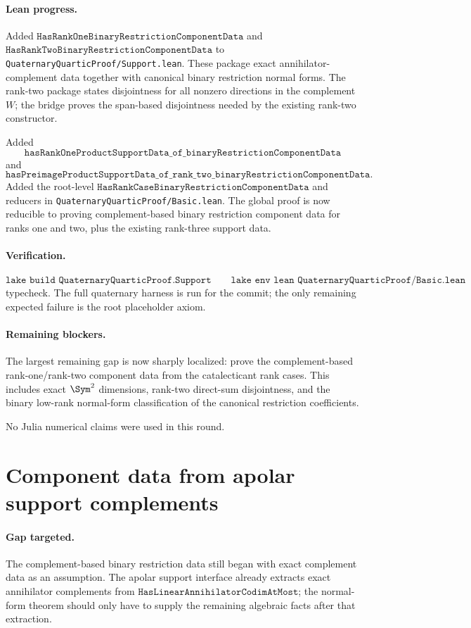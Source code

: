 \documentclass[11pt]{article}
\begin{document}
\paragraph{Lean progress.}
Added \(\texttt{HasRankOneBinaryRestrictionComponentData}\) and
\(\texttt{HasRankTwoBinaryRestrictionComponentData}\) to
\texttt{QuaternaryQuarticProof/Support.lean}.  These package exact
annihilator-complement data together with canonical binary restriction normal
forms.  The rank-two package states disjointness for all nonzero directions in
the complement \(W\); the bridge proves the span-based disjointness needed by
the existing rank-two constructor.

Added
\[
\texttt{hasRankOneProductSupportData\_of\_binaryRestrictionComponentData}
\]
and
\[
\texttt{hasPreimageProductSupportData\_of\_rank\_two\_binaryRestrictionComponentData}.
\]
Added the root-level
\(\texttt{HasRankCaseBinaryRestrictionComponentData}\) and reducers in
\texttt{QuaternaryQuarticProof/Basic.lean}.  The global proof is now reducible
to proving complement-based binary restriction component data for ranks one
and two, plus the existing rank-three support data.

\paragraph{Verification.}
\[
\texttt{lake build QuaternaryQuarticProof.Support}
\qquad
\texttt{lake env lean QuaternaryQuarticProof/Basic.lean}
\]
typecheck.  The full quaternary harness is run for the commit; the only
remaining expected failure is the root placeholder axiom.

\paragraph{Remaining blockers.}
The largest remaining gap is now sharply localized: prove the complement-based
rank-one/rank-two component data from the catalecticant rank cases.  This
includes exact \(\Sym^2\) dimensions, rank-two direct-sum disjointness, and the
binary low-rank normal-form classification of the canonical restriction
coefficients.

No Julia numerical claims were used in this round.

\section*{Component data from apolar support complements}

\paragraph{Gap targeted.}
The complement-based binary restriction data still began with exact complement
data as an assumption.  The apolar support interface already extracts exact
annihilator complements from
\(\texttt{HasLinearAnnihilatorCodimAtMost}\); the normal-form theorem should
only have to supply the remaining algebraic facts after that extraction.
\end{document}
